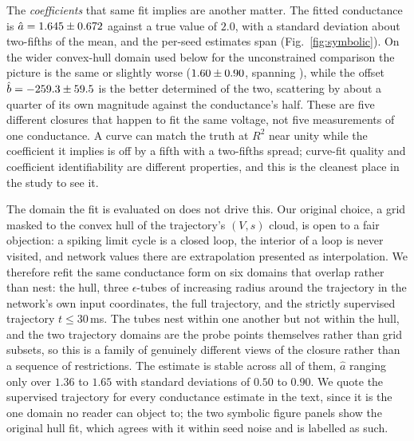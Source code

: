 \documentclass{article}
\newcommand{\Ttrain}{30}       %
\newcommand{\gcaMain}{2.0}     %
\begin{document}
The \emph{coefficients} that same fit implies are another matter. The fitted
conductance is $\hat a = 1.645 \pm 0.672$ against a true value of
$\gcaMain$, with a standard deviation about two-fifths of the mean, and the
per-seed estimates span \valSymbolicAHatRangeTrajTrain{} (Fig.~\ref{fig:symbolic}).
On the wider convex-hull domain used below for the unconstrained comparison the
picture is the same or slightly worse ($1.60 \pm 0.90$, spanning
\valSymbolicAHatRange), while the offset $\hat b = -259.3 \pm 59.5$ is the
better determined of the two, scattering by about a quarter of its own magnitude
against the conductance's half. These are five different closures that happen
to fit the same voltage, not five measurements of one conductance. A curve can match the
truth at $R^2$ near unity while the coefficient it implies is off by a fifth with
a two-fifths spread; curve-fit quality and coefficient identifiability are
different properties, and this is the cleanest place in the study to see it.

The domain the fit is evaluated on does not drive this. Our original choice, a
grid masked to the convex hull of the trajectory's $(V,s)$ cloud, is open to a
fair objection: a spiking limit cycle is a closed loop, the interior of a loop is
never visited, and network values there are extrapolation presented as
interpolation. We therefore refit the same conductance form on six domains that
overlap rather than nest: the hull, three $\epsilon$-tubes of increasing radius
around the trajectory in the network's own input coordinates, the full
trajectory, and the strictly supervised trajectory $t\le\Ttrain$\,ms. The tubes
nest within one another but not within the hull, and the two trajectory domains
are the probe points themselves rather than grid subsets, so this is a family of
genuinely different views of the closure rather than a sequence of
restrictions. The estimate is stable across all of them, $\hat a$ ranging only
over $1.36$ to $1.65$ with standard %
deviations of $0.50$ to $0.90$. %
We quote the supervised trajectory for every conductance estimate in the text,
since it is the one domain no reader can object to; the two symbolic figure
panels show the original hull fit, which agrees with it within seed noise and is
labelled as such.
\end{document}
